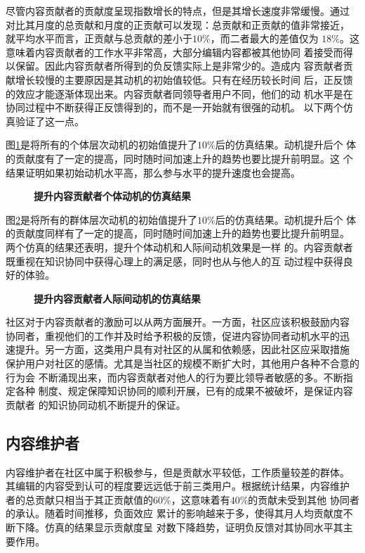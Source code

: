 尽管内容贡献者的贡献度呈现指数增长的特点，但是其增长速度非常缓慢。通过
对比其月度的总贡献和月度的正贡献可以发现：总贡献和正贡献的值非常接近，
就平均水平而言，正贡献与总贡献的差小于$10\%$，而二者最大的差值仅为
$18\%$。这意味着内容贡献者的工作水平非常高，大部分编辑内容都被其他协同
着接受而得以保留。因此内容贡献者所得到的负反馈实际上是非常少的。造成内
容贡献者贡献增长较慢的主要原因是其动机的初始值较低。只有在经历较长时间
后，正反馈的效应才能逐渐体现出来。内容贡献者同领导者用户不同，他们的动
机水平是在协同过程中不断获得正反馈得到的，而不是一开始就有很强的动机。
以下两个仿真验证了这一点。

图\ref{fig:improve5}是将所有的个体层次动机的初始值提升了$10\%$后的仿真结果。动机提升后个
体的贡献度有了一定的提高，同时随时间加速上升的趋势也要比提升前明显。这
个结果证明如果初始动机水平高，那么参与水平的提升速度也会提高。

\begin{figure}[!htb]
  \centering
  
 \caption{\small{\textbf{提升内容贡献者个体动机的仿真结果}}}
  \label{fig:improve5}
\end{figure}

图\ref{fig:improve6}是将所有的群体层次动机的初始值提升了$10\%$后的仿真结果。动机提升后个
体的贡献度同样有了一定的提高，同时随时间加速上升的趋势也要比提升前明显。
两个仿真的结果还表明，提升个体动机和人际间动机效果是一样
的。内容贡献者既重视在知识协同中获得心理上的满足感，同时也从与他人的互
动过程中获得良好的体验。

\begin{figure}[!htb]
  \centering
  
  \caption{\small{\textbf{提升内容贡献者人际间动机的仿真结果}}}
  \label{fig:improve6}
\end{figure}

社区对于内容贡献者的激励可以从两方面展开。一方面，社区应该积极鼓励内容
协同者，重视他们的工作并及时给予积极的反馈，促进内容协同者动机水平的迅
速提升。另一方面，这类用户具有对社区的从属和依赖感，因此社区应采取措施
保护用户对社区的感情。尤其是当社区的规模不断扩大时，其他用户各种不合意的行为会
不断涌现出来，而内容贡献者对他人的行为要比领导者敏感的多。不断指定各种
制度、规定保障知识协同的顺利开展，已有的成果不被破坏，是保证内容贡献者
的知识协同动机不断提升的保证。

\subsection{内容维护者}
内容维护者在社区中属于积极参与，但是贡献水平较低，工作质量较差的群体。
其编辑的内容受到认可的程度要远远低于前三类用户。根据统计结果，内容维护
者的总贡献只相当于其正贡献值的$60\%$，这意味着有$40\%$的贡献未受到其他
协同者的承认。随着时间推移，负面效应
累计的影响越来于多，使得其月人均贡献度不断下降。仿真的结果显示贡献度呈
对数下降趋势，证明负反馈对其协同水平其主要作用。

